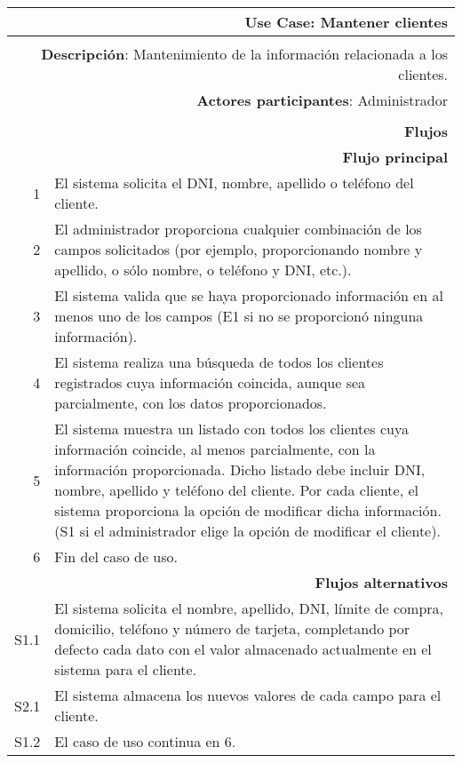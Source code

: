 \begin{tabularx}{\textwidth}{| r | X |}
\hline
\multicolumn{2}{|X|}{
\textbf{Use Case}: Mantener clientes} \\

\hline
\multicolumn{2}{|c|}{\cellcolor[gray]{0.6}} \\

\hline
\multicolumn{2}{|X|}{
\textbf{Descripción}: Mantenimiento de la información relacionada a los
clientes.} \\

\hline
\multicolumn{2}{|X|}{
\textbf{Actores participantes}: Administrador} \\

\hline
\multicolumn{2}{|c|}{\cellcolor[gray]{0.6} } \\

\hline
\multicolumn{2}{|X|}{
\textbf{Flujos}} \\

\hline
\multicolumn{2}{|X|}{
\textbf{Flujo principal}} \\

\hline
1 & El sistema solicita el DNI, nombre, apellido o teléfono del cliente. \\
\hline
2 & El administrador proporciona cualquier combinación de los campos
solicitados (por ejemplo, proporcionando nombre y apellido, o sólo nombre, o
teléfono y DNI, etc.). \\
\hline
3 & El sistema valida que se haya proporcionado información en al menos uno de
los campos (E1 si no se proporcionó ninguna información). \\
\hline
4 & El sistema realiza una búsqueda de todos los clientes registrados cuya
información coincida, aunque sea parcialmente, con los datos proporcionados. \\
\hline
5 & El sistema muestra un listado con todos los clientes cuya información
coincide, al menos parcialmente, con la información proporcionada. Dicho
listado debe incluir DNI, nombre, apellido y teléfono del cliente. Por cada
cliente, el sistema proporciona la opción de modificar dicha información. (S1
si el administrador elige la opción de modificar el cliente). \\
\hline
6 & Fin del caso de uso. \\

\hline
\multicolumn{2}{|X|}{
\textbf{Flujos alternativos}} \\

\hline
S1.1 & El sistema solicita el nombre, apellido, DNI, límite de compra,
domicilio, teléfono y número de tarjeta, completando por defecto cada dato con
el valor almacenado actualmente en el sistema para el cliente. \\
\hline
S2.1 & El sistema almacena los nuevos valores de cada campo para el cliente. \\
\hline
S1.2 & El caso de uso continua en 6. \\


\end{tabularx}
